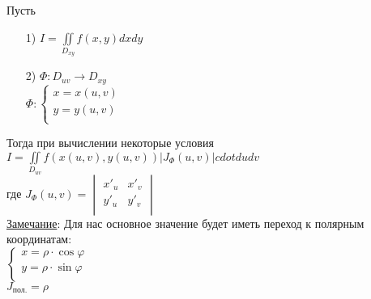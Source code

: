 



Пусть 
\begin{enumerate}
\item[1)] $\displaystyle  I = \iint\limits_{D_{xy}} f(x, y) dxdy$

\item[2)] $\Phi: D_{uv} \to D_{xy}$ \\
$\Phi: 
\begin{cases}
	x = x(u, v) \\
	y = y(u, v) \\
\end{cases}$ \\
\end{enumerate}
Тогда при вычислении некоторые условия \\
$\displaystyle  I = \iint\limits_{D_{uv}} f \left( x(u, v), y(u,v) \right) \left|J_\Phi (u,v) \right| cdot dudv$ \\
где $J_\Phi (u,v) = 
\begin{vmatrix}
	x'_u & x'_v \\
	y'_u & y'_v \\
\end{vmatrix}$ \\


\underline{Замечание}: Для нас основное значение будет иметь переход к полярным координатам: \\
$\begin{cases}
	x = \rho \cdot \cos{\varphi} \\
	y = \rho \cdot \sin{\varphi} \\
\end{cases}$ \\
$J_{\text{пол.}} = \rho$ \\

